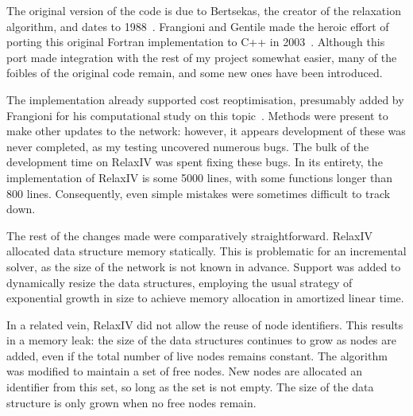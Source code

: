 The original version of the code is due to Bertsekas, the creator of the relaxation algorithm, and dates to 1988~\cite{BertsekasCodes:1988}. Frangioni and Gentile made the heroic effort of porting this original Fortran implementation to C++ in 2003~\cite{RelaxIV:2011}. Although this port made integration with the rest of my project somewhat easier, many of the foibles of the original code remain, and some new ones have been introduced.

The implementation already supported cost reoptimisation, presumably added by Frangioni for his computational study on this topic~\cite{Frangioni:2006}. Methods were present to make other updates to the network: however, it appears development of these was never completed, as my testing uncovered numerous bugs. The bulk of the development time on RelaxIV was spent fixing these bugs. In its entirety, the implementation of RelaxIV is some 5000 lines, with some functions longer than 800 lines. Consequently, even simple mistakes were sometimes difficult to track down\footnotemark.

The rest of the changes made were comparatively straightforward. RelaxIV allocated data structure memory statically. This is problematic for an incremental solver, as the size of the network is not known in advance. Support was added to dynamically resize the data structures, employing the usual strategy of exponential growth in size to achieve memory allocation in amortized linear time\footnotemark.

In a related vein, RelaxIV did not allow the reuse of node identifiers. This results in a memory leak: the size of the data structures continues to grow as nodes are added, even if the total number of live nodes remains constant. The algorithm was modified to maintain a set of free nodes. New nodes are allocated an identifier from this set, so long as the set is not empty. The size of the data structure is only grown when no free nodes remain.

